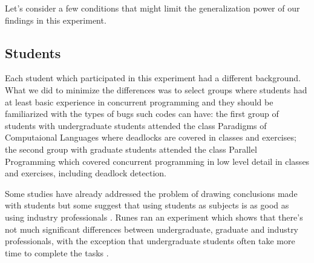 Let's consider a few conditions that might limit the generalization power of our findings in this experiment.

\subsection{Students}

Each student which participated in this experiment had a different background. What we did to minimize the differences was to select groups where students had at least basic experience in concurrent programming and they should be familiarized with the types of bugs such codes can have: the first group of students with undergraduate students attended the class Paradigms of Computaional Languages where deadlocks are covered in classes and exercises; the second group with graduate students attended the class Parallel Programming which covered concurrent programming in low level detail in classes and exercises, including deadlock detection.

Some studies have already addressed the problem of drawing conclusions made with students but some suggest that using students as subjects is as good as using industry professionals \cite{staron}. Runes ran an experiment which shows that there's not much significant differences between undergraduate, graduate and industry professionals, with the exception that undergraduate students often take more time to complete the tasks \cite{runes}.




